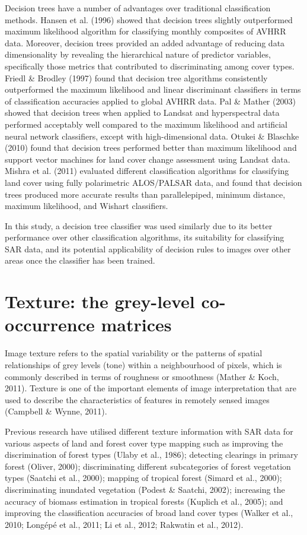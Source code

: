 Decision trees have a number of advantages over traditional classification methods. Hansen et al. (1996) showed that decision trees slightly outperformed maximum likelihood algorithm for classifying monthly composites of AVHRR data. Moreover, decision trees provided an added advantage of reducing data dimensionality by revealing the hierarchical nature of predictor variables, specifically those metrics that contributed to discriminating among cover types. Friedl \& Brodley (1997) found that decision tree algorithms consistently outperformed the maximum likelihood and linear discriminant classifiers in terms of classification accuracies applied to global AVHRR data. Pal \& Mather (2003) showed that decision trees when applied to Landsat and hyperspectral data performed acceptably well compared to the maximum likelihood and artificial neural network classifiers, except with high-dimensional data. Otukei \& Blaschke (2010) found that decision trees performed better than maximum likelihood and support vector machines for land cover change assessment using Landsat data. Mishra et al. (2011) evaluated different classification algorithms for classifying land cover using fully polarimetric ALOS/PALSAR data, and found that decision trees produced more accurate results than parallelepiped, minimum distance, maximum likelihood, and Wishart classifiers.

In this study, a decision tree classifier was used similarly due to its better performance over other classification algorithms, its suitability for classifying SAR data, and its potential applicability of decision rules to images over other areas once the classifier has been trained.

\section{Texture: the grey-level co-occurrence matrices}
\label{sec: litrev-texture-glcm}

Image texture refers to the spatial variability or the patterns of spatial relationships of grey levels (tone) within a neighbourhood of pixels, which is commonly described in terms of roughness or smoothness (Mather \& Koch, 2011). Texture is one of the important elements of image interpretation that are used to describe the characteristics of features in remotely sensed images (Campbell \& Wynne, 2011).

Previous research have utilised different texture information with SAR data for various aspects of land and forest cover type mapping such as improving the discrimination of forest types (Ulaby et al., 1986); detecting clearings in primary forest (Oliver, 2000); discriminating different subcategories of forest vegetation types (Saatchi et al., 2000); mapping of tropical forest (Simard et al., 2000); discriminating inundated vegetation (Podest \& Saatchi, 2002); increasing the accuracy of biomass estimation in tropical forests (Kuplich et al., 2005); and improving the classification accuracies of broad land cover types (Walker et al., 2010; Longépé et al., 2011; Li et al., 2012; Rakwatin et al., 2012).

